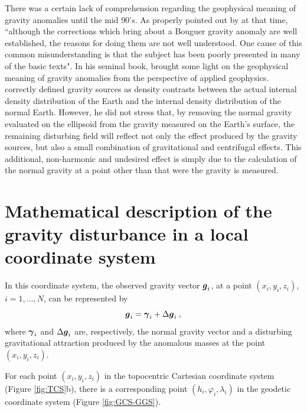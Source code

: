 \documentclass[extra]{gji}
\begin{document}
There was a certain lack of comprehension regarding the
geophysical meaning of gravity anomalies until the
mid 90's.
As properly pointed out by \citet{chapin1996} at that time, 
``although the corrections which bring about a Bouguer 
gravity anomaly are well established, the reasons for doing
them are not well understood. One cause of this common 
misunderstanding is that the subject has been poorly presented in
many of the basic texts".
In his seminal book, \citet{blakely1996} brought some light
on the geophysical meaning of gravity anomalies from the 
perspective of applied geophysics. \citet{blakely1996} correctly
defined gravity sources as density contrasts between the actual
internal density distribution of the Earth and the internal density
distribution of the normal Earth.
However, he did not stress that, by removing the normal gravity 
evaluated on the ellipsoid from the gravity measured 
on the Earth's surface, the remaining disturbing field will reflect 
not only the effect produced by the gravity sources, but also a
small combination of gravitational and centrifugal effects.
This additional, non-harmonic and undesired effect is 
simply due to the calculation of the normal gravity at a point
other than that were the gravity is measured.


\section{Mathematical description of the gravity disturbance in a local coordinate system}


In this coordinate system, the observed gravity vector
$\mitbf{g}_{i}$, at a point $(x_{i}, y_{i}, z_{i})$, 
$i = 1, ..., N$, can be represented by
\begin{equation}
\mitbf{g}_{i} = \mitbf{\gamma}_{i} + \Delta \mitbf{g}_{i} \: ,
\label{eq:gravity-vector}
\end{equation}
where $\mitbf{\gamma}_{i}$ and $\Delta \mitbf{g}_{i}$
are, respectively, the normal gravity vector and a
disturbing gravitational attraction produced by the anomalous 
masses at the point $(x_{i}, y_{i}, z_{i})$.

For each point $(x_{i}, y_{i}, z_{i})$ in the topocentric
Cartesian coordinate system (Figure \ref{fig:TCS}b), there is
a corresponding point $(h_{i}, \varphi_{i}, \lambda_{i})$
in the geodetic coordinate system (Figure \ref{fig:GCS-GGS}).
\end{document}
